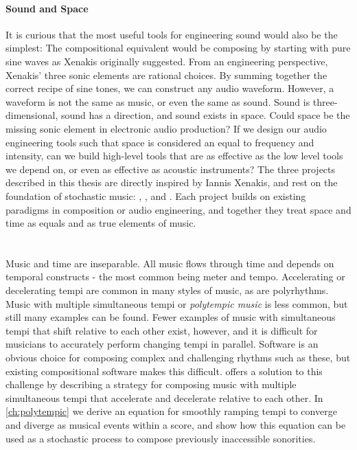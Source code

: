 \paragraph{Sound and Space}
It is curious that the most useful tools for engineering sound would
also be the simplest: The compositional equivalent would be composing
by starting with pure sine waves as Xenakis originally suggested.
From an engineering perspective, Xenakis' three sonic elements are
rational choices. By summing together the correct recipe of sine
tones, we can construct any audio waveform. However, a waveform is not
the same as music, or even the same as sound. Sound is
three-dimensional, sound has a direction, and sound exists in
space. Could space be the missing sonic element in electronic audio
production? If we design our audio engineering tools such that space
is considered an equal to frequency and intensity, can we build
high-level tools that are as effective as the low level tools we depend
on, or even as effective as acoustic instruments? The three projects
described in this thesis are directly inspired by Iannis Xenakis, and rest on
the foundation of stochastic music:  \polytempic, , and
\thesis. Each project builds on existing paradigms in composition or
audio engineering, and together they treat space and time as equals
and as true elements of music.

\section{\polytempic}
\label{sec:polytempic-intro}
Music and time are inseparable. All music flows through
time and depends on temporal constructs - the most common being meter
and tempo. Accelerating or decelerating tempi are common in many
styles of music, as are polyrhythms.  Music with multiple simultaneous
tempi or \textit{polytempic music} is less common, but still many
examples can be found. Fewer examples of music with simultaneous tempi
that shift relative to each other exist, however, and it is difficult
for musicians to accurately perform changing tempi in
parallel. Software is an obvious choice for composing complex and
challenging rhythms such as these, but existing compositional software
makes this difficult. \polytempic offers a solution to this challenge
by describing a strategy for composing music with multiple
simultaneous tempi that accelerate and decelerate relative to each
other. In \autoref{ch:polytempic} we derive an equation for smoothly
ramping tempi to converge and diverge as musical events within a
score, and show how this equation can be used as a stochastic process
to compose previously inaccessible sonorities.

